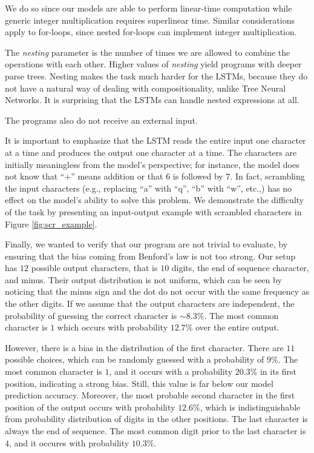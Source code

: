 We do so since our models are able to perform linear-time computation while generic integer multiplication requires superlinear time. Similar considerations apply to for-loops, since nested for-loops can implement integer multiplication. 

The \textit{nesting} parameter is the number of times we are allowed to combine the operations with each other. Higher values of \textit{nesting} yield programs with deeper parse trees. Nesting makes the task much harder for the LSTMs, because they do not have a natural way of dealing with compositionality, unlike Tree Neural Networks. It is surprising that the LSTMs can handle nested expressions at all.

The programs also do not receive an external input.

It is important to emphasize that the LSTM reads the entire input one character at a time and produces the output one character at a time. The characters are initially meaningless from the model's perspective; for instance, the model does not know that ``+'' means addition or that $6$ is followed by $7$. In fact, scrambling the input characters (e.g., replacing ``a''  with ``q'', ``b'' with ``w'', etc.,) has no effect on the model's ability to solve this problem. We demonstrate the difficulty of the task by presenting an input-output example with scrambled characters in Figure \ref{fig:scr_example}. 

Finally, we wanted to verify that our program are not trivial to evaluate, by ensuring that the bias coming from Benford's law \citep{hill1995statistical} is not too strong. Our setup has $12$ possible output characters, that is $10$ digits, the end of sequence character, and minus. Their output distribution is not uniform, which can be seen by noticing that the minus sign and the dot do not occur with the same frequency as the other digits. If we assume that the output characters are independent, the probability of guessing the correct character is $\sim 8.3\%$. The most common character is $1$ which occurs with probability
$12.7\%$ over the entire output.

However, there is a bias in the distribution of the first character. There are $11$ possible choices, which can be randomly guessed with a probability of $9\%$. The most common character is $1$, and it occurs with a probability
$20.3\%$ in its first position, indicating a strong bias. Still, this value is far below our model prediction accuracy. Moreover, the most probable second character in the first position of the output occurs with probability $12.6\%$, which is indistinguishable from probability distribution of digits in the other positions. The last character is always the end of sequence. The most common digit prior to the last character is $4$, and it occures with probability $10.3\%$.  

